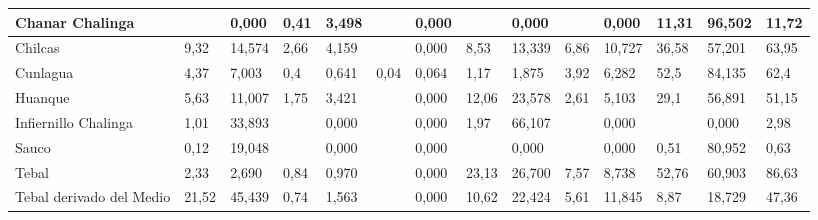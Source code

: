 \documentclass[]{article}
\begin{document}
\begin{landscape}
\begin{longtable}{|p{2.5cm}|p{1.5cm}|p{1cm}|p{1cm}|p{1cm}|p{1cm}|p{1cm}|p{1.7cm}|p{1cm}|p{1.5cm}|p{1cm}|p{1cm}|p{1cm}|p{1.5cm}|}
	Chanar Chalinga                  &                 & 0,000       & 0,41                 & 3,498       &                        & 0,000       &                      & 0,000       &                  & 0,000       & 11,31                & 96,502      & 11,72                  \\ \hline
	Chilcas                          & 9,32            & 14,574      & 2,66                 & 4,159       &                        & 0,000       & 8,53                 & 13,339      & 6,86             & 10,727      & 36,58                & 57,201      & 63,95                  \\ \hline
	Cunlagua                         & 4,37            & 7,003       & 0,4                  & 0,641       & 0,04                   & 0,064       & 1,17                 & 1,875       & 3,92             & 6,282       & 52,5                 & 84,135      & 62,4                   \\ \hline
	Huanque                          & 5,63            & 11,007      & 1,75                 & 3,421       &                        & 0,000       & 12,06                & 23,578      & 2,61             & 5,103       & 29,1                 & 56,891      & 51,15                  \\ \hline
	Infiernillo Chalinga             & 1,01            & 33,893      &                      & 0,000       &                        & 0,000       & 1,97                 & 66,107      &                  & 0,000       &                      & 0,000       & 2,98                   \\ \hline
	Sauco                            & 0,12            & 19,048      &                      & 0,000       &                        & 0,000       &                      & 0,000       &                  & 0,000       & 0,51                 & 80,952      & 0,63                   \\ \hline
	Tebal                            & 2,33            & 2,690       & 0,84                 & 0,970       &                        & 0,000       & 23,13                & 26,700      & 7,57             & 8,738       & 52,76                	& 60,903      & 86,63                  \\ \hline
	Tebal derivado del Medio         & 21,52           & 45,439      & 0,74                 & 1,563       &                        	& 0,000       & 10,62                & 22,424      & 5,61             & 11,845      & 8,87                 	& 18,729      & 47,36                 
	\end{longtable}

\end{landscape}
\end{document}
